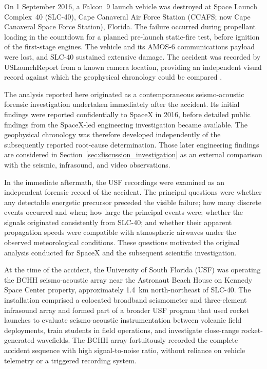 \documentclass[]{seismica}
\begin{document}
On 1 September 2016, a Falcon~9 launch vehicle was destroyed at Space Launch Complex~40 (SLC-40), Cape Canaveral Air Force Station (CCAFS; now Cape Canaveral Space Force Station), Florida. The failure occurred during propellant loading in the countdown for a planned pre-launch static-fire test, before ignition of the first-stage engines. The vehicle and its AMOS-6 communications payload were lost, and SLC-40 sustained extensive damage. The accident was recorded by USLaunchReport from a known camera location, providing an independent visual record against which the geophysical chronology could be compared \citep{uslaunchreport_amos6_video_2016}.

The analysis reported here originated as a contemporaneous seismo-acoustic forensic investigation undertaken immediately after the accident. Its initial findings were reported confidentially to SpaceX in 2016, before detailed public findings from the SpaceX-led engineering investigation became available. The geophysical chronology was therefore developed independently of the subsequently reported root-cause determination. Those later engineering findings are considered in Section~\ref{sec:discussion_investigation} as an external comparison with the seismic, infrasound, and video observations.

In the immediate aftermath, the USF recordings were examined as an independent
forensic record of the accident. The principal questions were whether any
detectable energetic precursor preceded the visible failure; how many discrete
events occurred and when; how large the principal events were; whether the
signals originated consistently from SLC-40; and whether their apparent
propagation speeds were compatible with atmospheric airwaves under the observed
meteorological conditions. These questions motivated the original analysis
conducted for SpaceX and the subsequent scientific investigation.

At the time of the accident, the University of South Florida (USF) was
operating the BCHH seismo-acoustic array near the Astronaut Beach House on
Kennedy Space Center property, approximately 1.4~km north-northeast of SLC-40.
The installation comprised a colocated broadband seismometer and three-element
infrasound array and formed part of a broader USF program that used rocket
launches to evaluate seismo-acoustic instrumentation between volcanic field
  deployments, train students in field operations, and investigate close-range
rocket-generated wavefields. The BCHH array fortuitously recorded the complete
accident sequence with high signal-to-noise ratio, without reliance on vehicle
telemetry or a triggered recording system.
\end{document}
